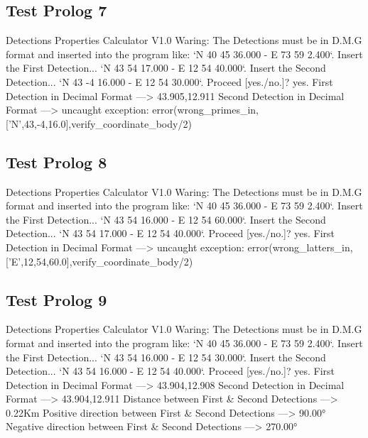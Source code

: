 \documentclass{article}
\begin{document}
\subsection*{Test Prolog 7}
	\begin{spverbatim}
		Detections Properties Calculator V1.0
		Waring: The Detections must be in D.M.G format and inserted into the program like: `N 40 45 36.000 - E 73 59 2.400`.
		Insert the First Detection...
		`N 43 54 17.000 - E 12 54 40.000`.
		Insert the Second Detection...
		`N 43 -4 16.000 - E 12 54 30.000`.
		Proceed [yes./no.]?
		yes.
		First Detection in Decimal Format ---> 43.905,12.911
		Second Detection in Decimal Format ---> 
		uncaught exception: error(wrong_primes_in,['N',43,-4,16.0],verify_coordinate_body/2)
	\end{spverbatim}

\subsection*{Test Prolog 8}
	\begin{spverbatim}
		Detections Properties Calculator V1.0
		Waring: The Detections must be in D.M.G format and inserted into the program like: `N 40 45 36.000 - E 73 59 2.400`.
		Insert the First Detection...
		`N 43 54 16.000 - E 12 54 60.000`.
		Insert the Second Detection...
		`N 43 54 17.000 - E 12 54 40.000`.
		Proceed [yes./no.]?
		yes.
		First Detection in Decimal Format ---> 
		uncaught exception: error(wrong_latters_in,['E',12,54,60.0],verify_coordinate_body/2)
	\end{spverbatim}

\subsection*{Test Prolog 9}
	\begin{spverbatim}
		Detections Properties Calculator V1.0
		Waring: The Detections must be in D.M.G format and inserted into the program like: `N 40 45 36.000 - E 73 59 2.400`.
		Insert the First Detection...
		`N 43 54 16.000 - E 12 54 30.000`.
		Insert the Second Detection...
		`N 43 54 16.000 - E 12 54 40.000`.
		Proceed [yes./no.]?
		yes.
		First Detection in Decimal Format ---> 43.904,12.908
		Second Detection in Decimal Format ---> 43.904,12.911
		Distance between First & Second Detections ---> 0.22Km
		Positive direction between First & Second Detections ---> 90.00°
		Negative direction between First & Second Detections ---> 270.00°
	\end{spverbatim}
\end{document}
